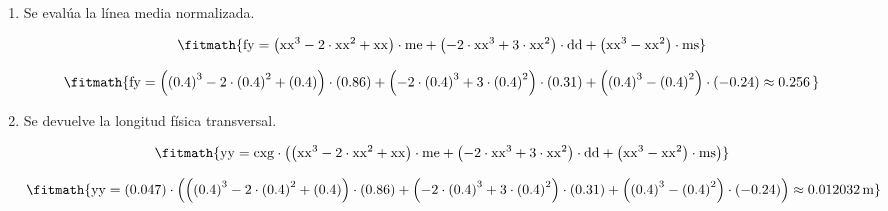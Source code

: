 \begin{enumerate}

\item Se evalúa la línea media normalizada.

\[\fitmath{\mathrm{fy}=\left({\mathrm{xx}}^{3}-2\cdot {\mathrm{xx}}^{2}+\mathrm{xx}\right)\cdot \mathrm{me}+\left(-2\cdot {\mathrm{xx}}^{3}+3\cdot {\mathrm{xx}}^{2}\right)\cdot \mathrm{dd}+\left({\mathrm{xx}}^{3}-{\mathrm{xx}}^{2}\right)\cdot \mathrm{ms}}\]

\[\fitmath{\mathrm{fy}=\left({(0.4)}^{3}-2\cdot {(0.4)}^{2}+(0.4)\right)\cdot (0.86)+\left(-2\cdot {(0.4)}^{3}+3\cdot {(0.4)}^{2}\right)\cdot (0.31)+\left({(0.4)}^{3}-{(0.4)}^{2}\right)\cdot (-0.24)\approx 0.256\,}\]

\item Se devuelve la longitud física transversal.

\[\fitmath{\mathrm{yy}=\mathrm{cxg}\cdot \left(\left({\mathrm{xx}}^{3}-2\cdot {\mathrm{xx}}^{2}+\mathrm{xx}\right)\cdot \mathrm{me}+\left(-2\cdot {\mathrm{xx}}^{3}+3\cdot {\mathrm{xx}}^{2}\right)\cdot \mathrm{dd}+\left({\mathrm{xx}}^{3}-{\mathrm{xx}}^{2}\right)\cdot \mathrm{ms}\right)}\]

\[\fitmath{\mathrm{yy}=(0.047)\cdot \left(\left({(0.4)}^{3}-2\cdot {(0.4)}^{2}+(0.4)\right)\cdot (0.86)+\left(-2\cdot {(0.4)}^{3}+3\cdot {(0.4)}^{2}\right)\cdot (0.31)+\left({(0.4)}^{3}-{(0.4)}^{2}\right)\cdot (-0.24)\right)\approx 0.012032\,\mathrm{m}}\]

\end{enumerate}
